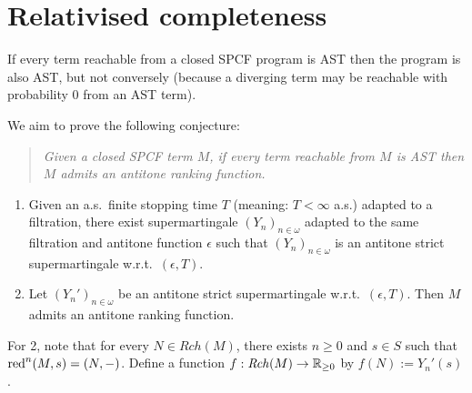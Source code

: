 
\section{Relativised completeness}
\label{sec:Relativised completeness}

If every term reachable from a closed SPCF program is AST then the program is also AST, but not conversely 
(because a diverging term may be reachable with probability 0 from an AST term).

We aim to prove the following conjecture:

\begin{quote}
\emph{Given a closed SPCF term $M$, if every term reachable from $M$ is AST then $M$ admits an antitone ranking function.}
\end{quote}

\begin{enumerate}

\item Given an a.s.~finite stopping time $T$ (meaning: $T < \infty$ a.s.) adapted to a filtration, there exist supermartingale $(Y_n)_{n \in \omega}$ adapted to the same filtration and antitone function $\epsilon$ such that $(Y_n)_{n \in \omega}$ is an antitone strict supermartingale w.r.t.~$(\epsilon, T)$.

\item Let $(Y_n')_{n \in \omega}$ be an antitone strict supermartingale w.r.t.~$(\epsilon, T)$. 
Then $M$ admits an antitone ranking function.
\end{enumerate}

For 2, note that for every $N \in \mathit{Rch}(M)$, there exists $n \geq 0$ and $s \in S$ such that $\operatorname{red}^n(M, s) = (N, -)$.
Define a function $f : \mathit{Rch}(M) \to \mathbb{R}_{{\geq}0}$ by $f(N) := Y_n'(s)$.

